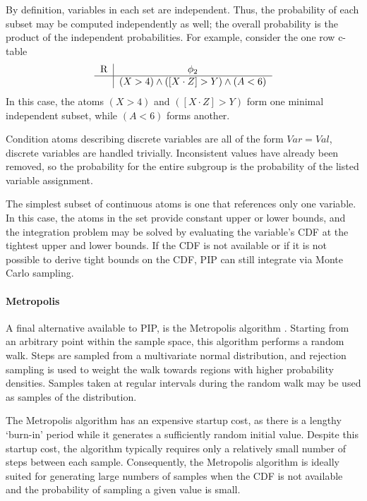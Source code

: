 By definition, variables in each set are independent.  Thus, the probability of each subset may be computed independently as well; the overall probability is the product of the independent probabilities.  For example, consider the one row c-table 
\[
\begin{tabular}{c|c}
R & $\phi_2$ \\
\hline
& $(X > 4) \wedge ([X\cdot Z] > Y) \wedge (A < 6)$ \\
\end{tabular}
\]
In this case, the atoms $(X > 4)$ and $([X\cdot Z] > Y)$ form one minimal independent subset, while $(A < 6)$ forms another.

Condition atoms describing discrete variables are all of the form $Var = Val$, discrete variables are handled trivially.  Inconsistent values have already been removed, so the probability for the entire subgroup is the probability of the listed variable assignment.

The simplest subset of continuous atoms is one that references only one variable.  In this case, the atoms in the set provide constant upper or lower bounds, and the integration problem may be solved by evaluating the variable's CDF at the tightest upper and lower bounds.  If the CDF is not available or if it is not possible to derive tight bounds on the CDF, PIP can still integrate via Monte Carlo sampling.  

\paragraph{Metropolis}
A final alternative available to PIP, is the
Metropolis  algorithm \cite{metropolis}.   Starting from  an arbitrary
point within the sample space,  this algorithm performs a random walk.
Steps  are  sampled  from  a  multivariate  normal  distribution,  and
rejection sampling  is used  to weight the  walk towards  regions with
higher  probability  densities.  Samples  taken  at regular  intervals
during the random walk may be used as samples of the distribution.

The Metropolis algorithm has an  expensive startup cost, as there is a
lengthy  `burn-in' period  while  it generates  a sufficiently  random
initial  value.  Despite  this startup  cost, the  algorithm typically
requires only a relatively small  number of steps between each sample.
Consequently,   the  Metropolis  algorithm   is  ideally   suited  for
generating large numbers of samples  when the CDF is not available and
the probability of sampling a given value is small.

